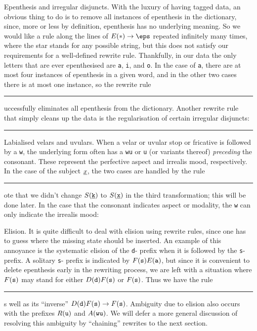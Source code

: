 \medskip\boldlabel Epenthesis and irregular disjuncts.
With the luxury of having tagged data,
an obvious thing to do is to remove all instances of epenthesis in the dictionary, since, more or less by definition,
epenthesis
has no underlying meaning. So we would like a rule along the lines of
$\E{*}\to \eps$ repeated infinitely many times, where the star stands for any possible string, but this does
not satisfy our requirements for a well-defined rewrite rule. Thankfully, in our data
the only letters that are ever epenthesised are {\tt a}, {\tt i}, and {\tt o}. In the case of {\tt a},
there are at most four instances of epenthesis in a given word, and in the other two cases there is at most
one instance, so the rewrite rule
\resetnum\parindent=34pt
\rule{$\E{a}\to \eps, \E{a}\to \eps,\E{a}\to \eps,\E{a}\to \eps, \E{i}\to \eps, \E{o}\to \eps$}
successfully eliminates all epenthesis from the dictionary. Another rewrite rule that simply cleans up the data
is the regularisation of certain irregular disjuncts:
\rule{$\Q{e}\to \Q{a},\Q{k}\to \Q{ka},\Q{\x'}\to \Q{\x'e},\Q{j}\to \Q{ji},\Q{t}\to \Q{tu}$}

\medskip\boldlabel Labialised velars and uvulars.
When a velar or uvular stop or fricative is followed by a {\tt w}, the underlying form often has a {\tt wu}
or {\tt u} (or variants thereof) {\it preceding} the consonant. These represent the perfective aspect and
irrealis mood, respectively. In the case of the subject $\underline{x}$, the two cases are handled by the rule
\rule{$\S{\x}\A{w}\to \A{wu}\S{\x}, \S{\x}\R{w}\to \R{u}\S{\x}, \S{\k}\R{w}\to \R{u}\S{\k}$.}
Note that we didn't change $S({\tt \underline{k}})$ to $S({\tt \underline{x}})$ in the third transformation; this will be done later.
In the case that the consonant indicates aspect or modality, the {\tt w} can only indicate the irrealis mood:

\medskip\boldlabel Elision. It is quite difficult to deal with elision using rewrite rules, since one has to
guess where the missing state should be inserted. An example of this annoyance is the systematic
elision of the {\tt d}- prefix when it is followed by the {\tt s}- prefix. A solitary {\tt s}- prefix is indicated
by $F({\tt s})E({\tt a})$, but since it is convenient to delete epenthesis early in the rewriting process, we are left
with a situation where $F({\tt s})$ may stand for either $D({\tt d})F({\tt s})$ or $F({\tt s})$. Thus we have the rule
\rule{$\F{s}\to \D{d}\F{s}$,}
as well as its ``inverse'' $D({\tt d})F({\tt s})\to F({\tt s})$. Ambiguity due to elision
also occurs with the prefixes $R({\tt u})$ and $A({\tt wu})$.
We will defer a more general discussion of resolving this ambiguity by ``chaining'' rewrites to the next section.

